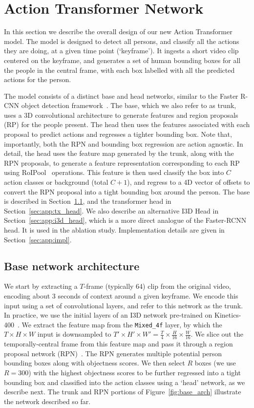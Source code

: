 \documentclass[10pt,twocolumn,letterpaper]{article}
\newcommand{\Tx}[0]{Action Transformer}
\begin{document}
\section{\Tx{}  Network}\label{sec:app}


In this section we describe the overall design of our new \Tx{} model.
The model is designed  to detect all persons, and
classify all the actions they are doing, at a given time point
(`keyframe').  It ingests a short video clip 
centered on the keyframe, and generates
a set of human bounding boxes for all the people in the central frame,
with each box labelled with all the
predicted actions for the person.

The model  consists of a distinct base and head networks, similar to the
Faster R-CNN object
detection framework~\cite{ren2015faster}.  The base, which we also refer to as trunk, uses a 
3D convolutional
architecture to generate features and region
proposals (RP) for the people present. The head then uses the features associated with each proposal to
predict actions and regresses a tighter bounding box. Note that, importantly, both the RPN and bounding box
regression 
are action agnostic. 
In detail, the head 
uses the feature map generated by the
trunk, along with the RPN proposals, to generate a feature
representation corresponding to each RP using RoIPool~\cite{huang2017speed} operations.
This feature is then used classify the box into $C$ action classes or background (total $C+1$),
and regress to a 4D vector of offsets to convert the RPN proposal into
a tight bounding box around the person.  The base  is described in
Section~\ref{sec:app:base_arch}, and the transformer head in
Section~\ref{sec:app:tx_head}. We also describe an alternative
I3D Head in
Section~\ref{sec:app:i3d_head}, which is a more direct analogue of the
Faster-RCNN head. It is used in the ablation study.  Implementation
details are given in Section~\ref{sec:app:impl}.

\subsection{Base network architecture}\label{sec:app:base_arch}

We start by
extracting a $T$-frame (typically 64) clip from the original video,
encoding about 3 seconds of context around a given keyframe. We encode
this input using a set of convolutional layers, and refer to this
network as the trunk. In practice, we use the initial layers of an I3D
network pre-trained on Kinetics-400~\cite{carreira2017quo}. We extract
the feature map from the {\tt Mixed\_4f} layer, by which the $T\times
H\times W$ input is downsampled to $T'\times H'\times W' = \frac{T}{4}
\times \frac{H}{16} \times \frac{W}{16}$. We slice out the temporally-central 
frame from this feature map and pass it through a region
proposal network (RPN)~\cite{ren2015faster}.  The RPN generates
multiple potential person bounding boxes along with objectness
scores. We then select $R$ boxes (we use $R=300$) with the highest objectness scores to be
further regressed into a tight bounding box and classified into the
action classes using a `head' network, as we describe next.  The trunk
and RPN portions of Figure~\ref{fig:base_arch} illustrate the network
described so far.
\end{document}
